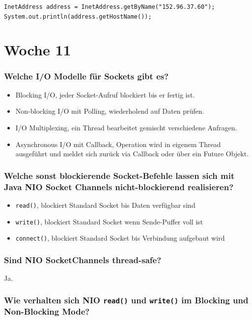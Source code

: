 \documentclass[10pt,a4paper]{scrartcl}
\begin{document}
\begin{verbatim}
InetAddress address = InetAddress.getByName("152.96.37.60");
System.out.println(address.getHostName());
\end{verbatim}


\section{Woche 11}

\subsubsection{Welche I/O Modelle für Sockets gibt es?}

\begin{itemize}
	\item Blocking I/O, jeder Socket-Aufruf blockiert bis er fertig ist.
	\item Non-blocking I/O mit Polling, wiederholend auf Daten prüfen.
	\item I/O Multiplexing, ein Thread bearbeitet gemischt verschiedene Anfragen.
	\item Asynchronous I/O mit Callback, Operation wird in eigenem Thread ausgeführt und meldet sich
		zurück via Callback oder über ein Future Objekt.
\end{itemize}

\subsubsection{Welche sonst blockierende Socket-Befehle lassen sich mit Java NIO Socket Channels
nicht-blockierend realisieren?}

\begin{itemize}
	\item \texttt{read()}, blockiert Standard Socket bis Daten verfügbar sind
	\item \texttt{write()}, blockiert Standard Socket wenn Sende-Puffer voll ist
	\item \texttt{connect()}, blockiert Standard Socket bis Verbindung aufgebaut wird
\end{itemize}

\subsubsection{Sind NIO SocketChannels thread-safe?}

Ja.
  
\subsubsection{Wie verhalten sich NIO \texttt{read()} und \texttt{write()} im Blocking und
Non-Blocking Mode?}
\end{document}
